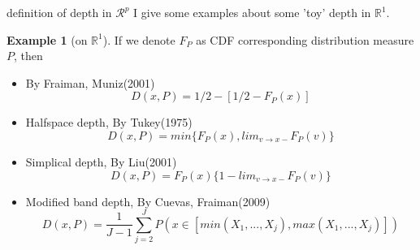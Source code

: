 \documentclass[aspectratio=169,ignorenonframetext,9pt]{beamer}
\theoremstyle{plain}
\theoremstyle{definition}
\newtheorem{exmp}{Example}[section]
\begin{document}
\begin{frame}{definition of depth in $\mathcal{R}^p$}
I give some examples about some 'toy' depth in $\mathbb{R}^1$.
\begin{exmp} [on $\mathbb{R}^1$]
    If we denote $F_P$ as CDF corresponding distribution measure $P$, then
    \begin{itemize}
        \item By Fraiman, Muniz(2001)
        \[D(x,P)=1/2-[1/2-F_P(x)]\]
        \item Halfspace depth, By Tukey(1975)
        \[D(x,P)=min\{F_P(x), lim_{v\rightarrow x-}F_P(v)\}\]
        \item Simplical depth, By Liu(2001)
        \[D(x,P)=F_P(x)\{1-lim_{v\rightarrow x-} F_P(v)\}\]
        \item Modified band depth, By Cuevas, Fraiman(2009)
        \[D(x,P)=\frac{1}{J-1}\sum_{j=2}^J P(x\in [min(X_1,...,X_j), max(X_1,...,X_j)])\]
    \end{itemize}
\end{exmp}
\end{frame}
\end{document}
